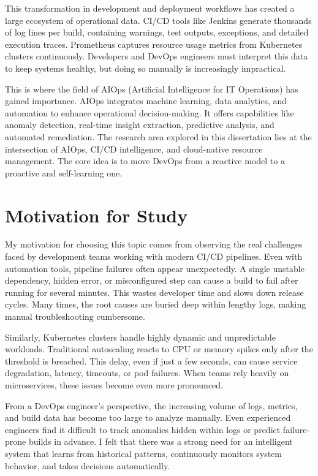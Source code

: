 \documentclass[a4paper,14pt,onecolumn]{report}
\begin{document}
This transformation in development and deployment workflows has created a large ecosystem of operational data. CI/CD tools like Jenkins generate thousands of log lines per build, containing warnings, test outputs, exceptions, and detailed execution traces. Prometheus captures resource usage metrics from Kubernetes clusters continuously. Developers and DevOps engineers must interpret this data to keep systems healthy, but doing so manually is increasingly impractical.

This is where the field of AIOps (Artificial Intelligence for IT Operations) has gained importance. AIOps integrates machine learning, data analytics, and automation to enhance operational decision-making. It offers capabilities like anomaly detection, real-time insight extraction, predictive analysis, and automated remediation. The research area explored in this dissertation lies at the intersection of AIOps, CI/CD intelligence, and cloud-native resource management. The core idea is to move DevOps from a reactive model to a proactive and self-learning one.

\section{Motivation for Study}

My motivation for choosing this topic comes from observing the real challenges faced by development teams working with modern CI/CD pipelines. Even with automation tools, pipeline failures often appear unexpectedly. A single unstable dependency, hidden error, or misconfigured step can cause a build to fail after running for several minutes. This wastes developer time and slows down release cycles. Many times, the root causes are buried deep within lengthy logs, making manual troubleshooting cumbersome.

Similarly, Kubernetes clusters handle highly dynamic and unpredictable workloads. Traditional autoscaling reacts to CPU or memory spikes only after the threshold is breached. This delay, even if just a few seconds, can cause service degradation, latency, timeouts, or pod failures. When teams rely heavily on microservices, these issues become even more pronounced.

From a DevOps engineer's perspective, the increasing volume of logs, metrics, and build data has become too large to analyze manually. Even experienced engineers find it difficult to track anomalies hidden within logs or predict failure-prone builds in advance. I felt that there was a strong need for an intelligent system that learns from historical patterns, continuously monitors system behavior, and takes decisions automatically.
\end{document}
